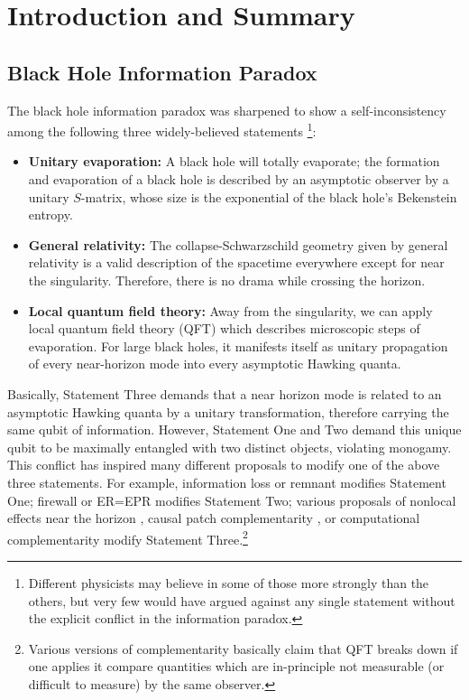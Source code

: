\documentclass[aps,showpacs,onecolumn,floats,prd,superscriptaddress,nofootinbib]{revtex4-1}
\begin{document}
\maketitle


\section{Introduction and Summary}

\subsection{Black Hole Information Paradox}

The black hole information paradox \cite{Haw76a} was sharpened to show a self-inconsistency among the following three widely-believed statements \cite{AMPS}\footnote{Different physicists may believe in some of those more strongly than the others, but very few would have argued against any single statement without the explicit conflict in the information paradox.}:
\begin{itemize}
\item {\bf Unitary evaporation:} A black hole will totally evaporate; the formation and evaporation of a black hole is described by an asymptotic observer by a unitary $S$-matrix, whose size is the exponential of the black hole's Bekenstein entropy.
\item {\bf General relativity:} The collapse-Schwarzschild geometry given by general relativity is a valid description of the spacetime everywhere except for near the singularity.
Therefore, there is no drama while crossing the horizon.
\item {\bf Local quantum field theory:} Away from the singularity, we can apply local quantum field theory (QFT) which describes microscopic steps of evaporation. 
For large black holes, it manifests itself as unitary propagation of every near-horizon mode into every asymptotic Hawking quanta.
\end{itemize}
Basically, Statement Three demands that a near horizon mode is related to an asymptotic Hawking quanta by a unitary transformation, therefore carrying the same qubit of information. 
However, Statement One and Two demand this unique qubit to be maximally entangled with two distinct objects, violating monogamy. 
This conflict has inspired many different proposals to modify one of the above three statements. 
For example, information loss or remnant \cite{Bek94} modifies Statement One; 
firewall \cite{BraPir09,AMPS} or ER=EPR \cite{MalSus13} modifies Statement Two;
various proposals of nonlocal effects near the horizon \cite{Gid12,DodSil15,OsuPag16}, causal patch complementarity \cite{HuiYan13,IlgYan13,LowTho14}, or computational complementarity \cite{HH} modify Statement Three.\footnote{Various versions of complementarity basically claim that QFT breaks down if one applies it compare quantities which are in-principle not measurable (or difficult to measure) by the same observer.} 
\end{document}
